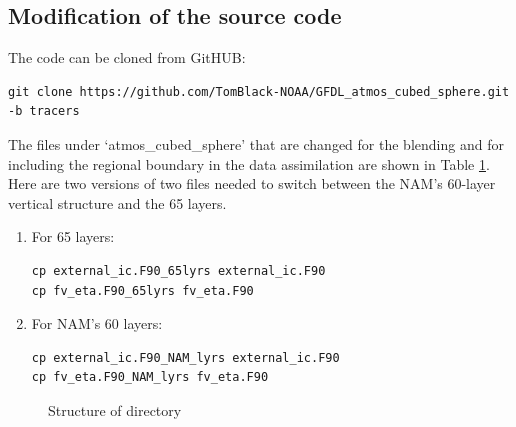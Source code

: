 \documentclass[11pt,fleqn]{report}              %
\begin{document}
\subsection{Modification of the source code}

The code can be cloned from GitHUB:
\lstset{language=bash}   
\begin{lstlisting}[frame=trBL]
git clone https://github.com/TomBlack-NOAA/GFDL_atmos_cubed_sphere.git -b tracers
\end{lstlisting}

The files under `atmos\_cubed\_sphere' that are changed for the blending and for including the regional boundary in the data assimilation are shown in Table \ref{table:blend_dir}. Here are two versions of two files needed to switch between the NAM's 60-layer vertical structure and the 65 layers.

\begin{enumerate}
\item For 65 layers:
\lstset{language=bash}   
\begin{lstlisting}[frame=trBL]
cp external_ic.F90_65lyrs external_ic.F90
cp fv_eta.F90_65lyrs fv_eta.F90
\end{lstlisting}

\item For NAM's 60 layers:
\lstset{language=bash}   
\begin{lstlisting}[frame=trBL]
cp external_ic.F90_NAM_lyrs external_ic.F90
cp fv_eta.F90_NAM_lyrs fv_eta.F90
\end{lstlisting}

\end{enumerate}


\begin{figure}[H]
\centering
\begin{minipage}{0.5\linewidth}
\end{minipage}
\caption{Structure of directory}
\label{table:blend_dir}
\end{figure}





\end{document}
